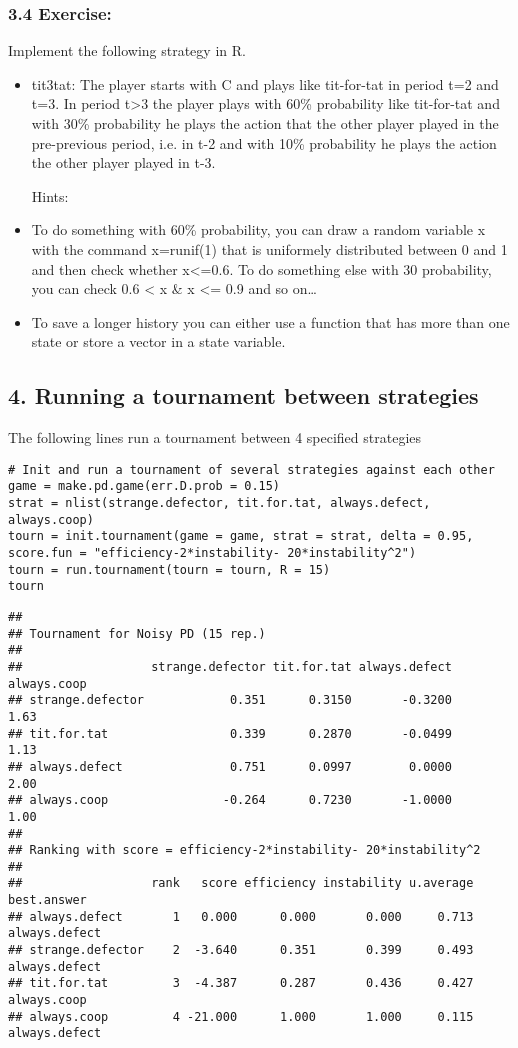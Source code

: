 \documentclass[]{article}
\begin{document}
\subsubsection{3.4 Exercise:}

Implement the following strategy in R.

\begin{itemize}
\item
  tit3tat: The player starts with C and plays like tit-for-tat in period
  t=2 and t=3. In period t\textgreater{}3 the player plays with 60\%
  probability like tit-for-tat and with 30\% probability he plays the
  action that the other player played in the pre-previous period, i.e.
  in t-2 and with 10\% probability he plays the action the other player
  played in t-3.

  Hints:
\item
  To do something with 60\% probability, you can draw a random variable
  x with the command x=runif(1) that is uniformely distributed between 0
  and 1 and then check whether x\textless{}=0.6. To do something else
  with 30 probability, you can check 0.6 \textless{} x \& x \textless{}=
  0.9 and so on\ldots{}
\item
  To save a longer history you can either use a function that has more
  than one state or store a vector in a state variable.
\end{itemize}

\subsection{4. Running a tournament between strategies}

The following lines run a tournament between 4 specified strategies

\begin{verbatim}
# Init and run a tournament of several strategies against each other
game = make.pd.game(err.D.prob = 0.15)
strat = nlist(strange.defector, tit.for.tat, always.defect, always.coop)
tourn = init.tournament(game = game, strat = strat, delta = 0.95, score.fun = "efficiency-2*instability- 20*instability^2")
tourn = run.tournament(tourn = tourn, R = 15)
tourn
\end{verbatim}

\begin{verbatim}
## 
## Tournament for Noisy PD (15 rep.)
## 
##                  strange.defector tit.for.tat always.defect always.coop
## strange.defector            0.351      0.3150       -0.3200        1.63
## tit.for.tat                 0.339      0.2870       -0.0499        1.13
## always.defect               0.751      0.0997        0.0000        2.00
## always.coop                -0.264      0.7230       -1.0000        1.00
## 
## Ranking with score = efficiency-2*instability- 20*instability^2
## 
##                  rank   score efficiency instability u.average   best.answer
## always.defect       1   0.000      0.000       0.000     0.713 always.defect
## strange.defector    2  -3.640      0.351       0.399     0.493 always.defect
## tit.for.tat         3  -4.387      0.287       0.436     0.427   always.coop
## always.coop         4 -21.000      1.000       1.000     0.115 always.defect
\end{verbatim}
\end{document}
